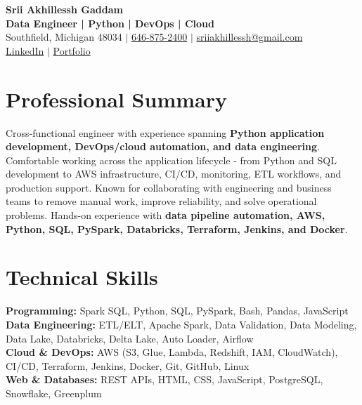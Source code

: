 \documentclass[letterpaper,10pt]{article}
\begin{document}
\fontsize{9.35pt}{10.45pt}\selectfont

\begin{center}
    {\LARGE \textbf{Srii Akhillessh Gaddam}} \\[-1pt]
    \textbf{Data Engineer | Python | DevOps | Cloud} \\[2pt]
    Southfield, Michigan 48034 $|$
    \href{tel:6468752400}{646-875-2400} $|$
    \href{mailto:sriiakhillessh@gmail.com}{sriiakhillessh@gmail.com} \\[1pt]
    \href{https://www.linkedin.com/in/srii-akhiilessh-gaddam-b48668191/}{LinkedIn} $|$
    \href{https://sriiakhillesshg.github.io/portfolio/}{Portfolio}
\end{center}
\vspace{-8pt}

\section{Professional Summary}
\small{Cross-functional engineer with experience spanning \textbf{Python application development, DevOps/cloud automation, and data engineering}. Comfortable working across the application lifecycle - from Python and SQL development to AWS infrastructure, CI/CD, monitoring, ETL workflows, and production support. Known for collaborating with engineering and business teams to remove manual work, improve reliability, and solve operational problems. Hands-on experience with \textbf{data pipeline automation, AWS, Python, SQL, PySpark, Databricks, Terraform, Jenkins, and Docker}.}

\section{Technical Skills}
\small{
\textbf{Programming:} Spark SQL, Python, SQL, PySpark, Bash, Pandas, JavaScript \\
\textbf{Data Engineering:} ETL/ELT, Apache Spark, Data Validation, Data Modeling, Data Lake, Databricks, Delta Lake, Auto Loader, Airflow \\
\textbf{Cloud \& DevOps:} AWS (S3, Glue, Lambda, Redshift, IAM, CloudWatch), CI/CD, Terraform, Jenkins, Docker, Git, GitHub, Linux \\
\textbf{Web \& Databases:} REST APIs, HTML, CSS, JavaScript, PostgreSQL, Snowflake, Greenplum
}
\end{document}
